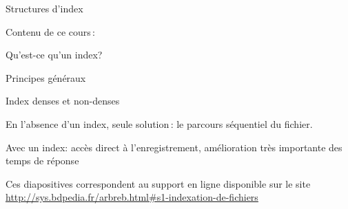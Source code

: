 


\begin{frame}[fragile]{Structures d'index}

Contenu de ce cours\,:

\begin{redbullet}
   \item Qu'est-ce qu'un index?
   
   \item Principes généraux
   
   \item Index denses et non-denses
\end{redbullet}

\vfill

\alert{En l'absence d'un index}, seule solution\,: le parcours séquentiel du fichier.
\vfill

\alert{Avec un index}: \alert{accès direct à l'enregistrement}, amélioration \alert{très importante} des temps de réponse


\vfill


\begin{blocgauche}
\alert{Ces diapositives correspondent au support en ligne disponible sur
le site \url{http://sys.bdpedia.fr/arbreb.html\#s1-indexation-de-fichiers}}
\end{blocgauche}

\end{frame}


